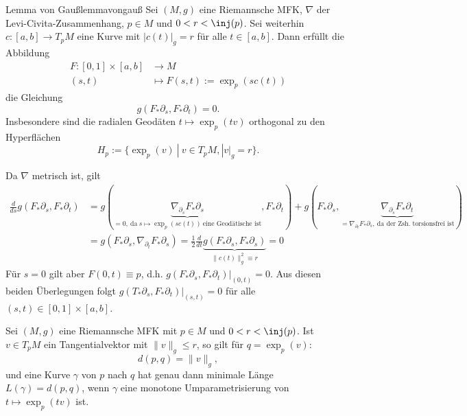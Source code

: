\begin{satz}{Lemma von Gauß}{lemmavongauß}
Sei $(M,g)$ eine Riemannsche MFK, $\nabla$ der Levi-Civita-Zusammenhang, $p \in M$ und $0 < r < \inj (p)$. Sei weiterhin $c: [a,b] \to T_pM$ eine Kurve mit $|c(t)|_g = r$ für alle $t \in [a,b]$. Dann erfüllt die Abbildung
\begin{align}
F: [0,1] \times [a,b] &\to M\\
(s,t) &\mapsto F(s,t):=\exp_p (s c(t))
\end{align}
die Gleichung
\begin{equation}
g(F_\ast \partial_s, F_\ast \partial_t) = 0.
\end{equation}
Insbesondere sind die radialen Geodäten $t \mapsto \exp_p (tv)$ orthogonal zu den Hyperflächen
\begin{equation}
H_p := \{ \exp_p (v) \ | \ v \in T_pM, |v|_g = r \}.
\end{equation}
\end{satz}
\begin{beweis}
Da $\nabla$ metrisch ist, gilt 
\begin{align}
\frac{d}{ds} g(F_\ast \partial_s, F_\ast \partial_t) &= g(\underbrace{\nabla_{\partial_s} F_\ast \partial_s}_{=0, \ \text{da} \ s \mapsto \exp_p(sc(t)) \ \text{eine Geodätische ist}}, F_\ast \partial_t)+ g(F_\ast \partial_s, \underbrace{\nabla_{\partial_s} F_\ast \partial_t}_{= \nabla_{\partial_t} F_\ast \partial_s, \ \text{da der Zsh. torsionsfrei ist}})\\
&= g(F_\ast \partial_s, \nabla_{\partial_t} F_\ast \partial_s) = \frac{1}{2} \frac{d}{dt} \underbrace{g(F_\ast \partial_s, F_\ast \partial_s)}_{\| c(t) \|^2_g \equiv r} = 0
\end{align}
Für $s=0$ gilt aber $F(0,t) \equiv p$, d.h. $g(F_\ast \partial_s, F_\ast \partial_t)|_{(0,t)} = 0$. Aus diesen beiden Überlegungen folgt $g(T_\ast \partial_s, F_\ast \partial_t)|_{(s,t)} = 0$ für alle $(s,t) \in [0,1]\times [a,b]$.
\end{beweis}
\begin{satz}{}{}
Sei $(M,g)$ eine Riemannsche MFK mit $p \in M$ und $0 < r < \inj(p)$. Ist $v \in T_pM$ ein Tangentialvektor mit $\| v \|_g \leq r$, so gilt für $q = \exp_p (v)$:
\begin{equation}
d(p,q) = \| v \|_g,
\end{equation}
und eine Kurve $\gamma$ von $p$ nach $q$ hat genau dann minimale Länge $L(\gamma) = d(p,q)$, wenn $\gamma$ eine monotone Umparametrisierung von $t \mapsto \exp_p (tv)$ ist.
\end{satz}

